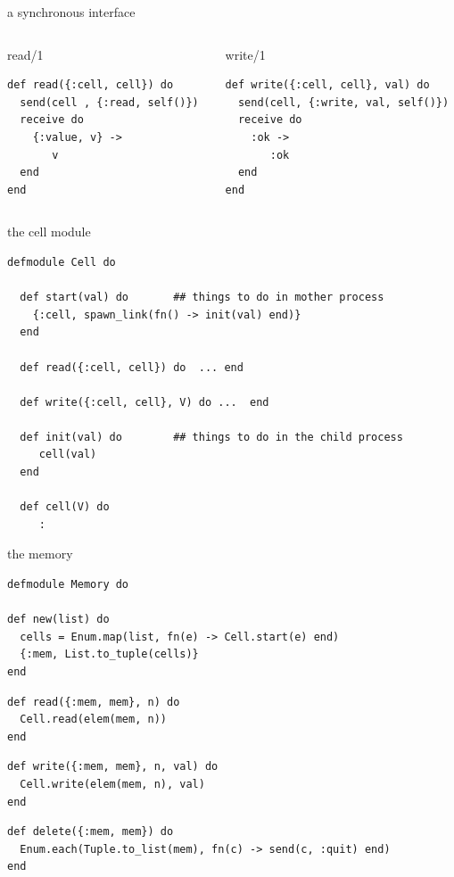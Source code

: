 \begin{frame}[fragile]{a synchronous interface}

\begin{columns}
\begin{column}{.5\linewidth}
\begin{block}{read/1}
 \begin{verbatim}
def read({:cell, cell}) do
  send(cell , {:read, self()})
  receive do
    {:value, v} ->
       v
  end
end
 \end{verbatim}
\end{block}
\end{column}
\pause
\begin{column}{.5\linewidth}
\begin{block}{write/1}
 \begin{verbatim}
def write({:cell, cell}, val) do
  send(cell, {:write, val, self()})
  receive do
    :ok ->
       :ok
  end
end
 \end{verbatim}
\end{block}
\end{column}
\end{columns}

\end{frame}

\begin{frame}[fragile]{the cell module}
\begin{verbatim}
defmodule Cell do

  def start(val) do       ## things to do in mother process
    {:cell, spawn_link(fn() -> init(val) end)}
  end

  def read({:cell, cell}) do  ... end

  def write({:cell, cell}, V) do ...  end

  def init(val) do        ## things to do in the child process
     cell(val)
  end

  def cell(V) do 
     :
\end{verbatim}
\end{frame}

\begin{frame}[fragile]{the memory}

\begin{verbatim}
defmodule Memory do

def new(list) do
  cells = Enum.map(list, fn(e) -> Cell.start(e) end)
  {:mem, List.to_tuple(cells)}
end
\end{verbatim} \pause
\begin{verbatim}
def read({:mem, mem}, n) do
  Cell.read(elem(mem, n))
end
\end{verbatim} \pause
\begin{verbatim}
def write({:mem, mem}, n, val) do
  Cell.write(elem(mem, n), val)
end
\end{verbatim} \pause
\begin{verbatim}
def delete({:mem, mem}) do
  Enum.each(Tuple.to_list(mem), fn(c) -> send(c, :quit) end)
end
\end{verbatim}
\end{frame}

